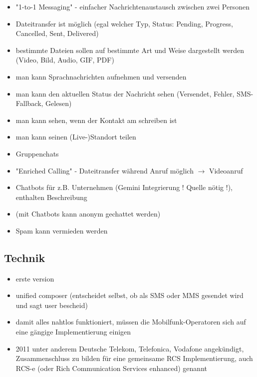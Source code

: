 \documentclass[conference]{IEEEtran}
\begin{document}
\begin{itemize}
    \item "1-to-1 Messaging" - einfacher Nachrichtenaustausch zwischen zwei Personen
    \item Dateitransfer ist möglich (egal welcher Typ, Status: Pending, Progress, Cancelled, Sent, Delivered)
    \item bestimmte Dateien sollen auf bestimmte Art und Weise dargestellt werden (Video, Bild, Audio, GIF, PDF)
    \item man kann Sprachnachrichten aufnehmen und versenden
    \item man kann den aktuellen Status der Nachricht sehen (Versendet, Fehler, SMS-Fallback, Gelesen)
    \item man kann sehen, wenn der Kontakt am schreiben ist
    \item man kann seinen (Live-)Standort teilen
    \item Gruppenchats
    \item "Enriched Calling" - Dateitransfer während Anruf möglich $\rightarrow$ Videoanruf
    \item Chatbots für z.B. Unternehmen (Gemini Integrierung ! Quelle nötig !), enthalten Beschreibung
    \item (mit Chatbots kann anonym gechattet werden)
    \item Spam kann vermieden werden
\end{itemize}
\cite{uniprof}

\subsection{Technik}

\begin{itemize}
    \item erste version
    \item unified composer (entscheidet selbst, ob als SMS oder MMS gesendet wird und sagt user bescheid)
\end{itemize}
\cite{rcsuite}

\begin{itemize}
    \item damit alles nahtlos funktioniert, müssen die Mobilfunk-Operatoren sich auf eine gängige Implementierung einigen
    \item 2011 unter anderem Deutsche Telekom, Telefonica, Vodafone angekündigt, Zusammenschluss zu bilden für eine gemeinsame RCS Implementierung, auch RCS-e (oder Rich Communication Services enhanced) genannt
\end{itemize}
\cite{rcsmno}
\end{document}

